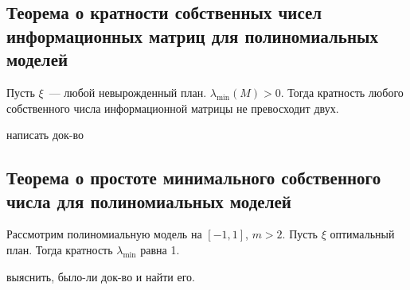  \subsection{Теорема о кратности собственных чисел информационных матриц для полиномиальных моделей}
 \begin{thm}
Пусть $\xi$ — любой невырожденный план. $\lambda_{\min}(M) > 0$. Тогда кратность любого собственного числа информационной матрицы не превосходит двух.
 \end{thm}
 {\color{blue} написать док-во}


 \subsection{Теорема о простоте минимального собственного числа для полиномиальных моделей}
 \begin{thm}
Рассмотрим полиномиальную модель на  $[-1,1]$, $m > 2$. Пусть $\xi$ оптимальный план. Тогда кратность $\lambda_{\min}$ равна 1.
 \end{thm}
{\color{blue} выяснить, было-ли док-во и найти его.}